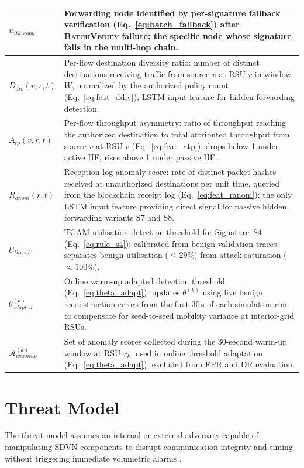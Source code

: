\documentclass[12pt, a4paper]{report}
\begin{document}
\begin{longtable}{|m{5.0cm}|m{9.0cm}|}
\hline
$v_{atk,copy}$ & Forwarding node identified by per-signature fallback verification (Eq.~\ref{eq:batch_fallback}) after \textsc{BatchVerify} failure; the specific node whose signature fails in the multi-hop chain. \\
\hline
$D_{div}(v,r,t)$ & Per-flow destination diversity ratio: number of distinct destinations receiving traffic from source $v$ at \ac{RSU} $r$ in window $W$, normalized by the authorized policy count (Eq.~\ref{eq:feat_ddiv}); \ac{LSTM} input feature for hidden forwarding detection. \\
\hline
$A_{tp}(v,r,t)$ & Per-flow throughput asymmetry: ratio of throughput reaching the authorized destination to total attributed throughput from source $v$ at \ac{RSU} $r$ (Eq.~\ref{eq:feat_atp}); drops below 1 under active \ac{HF}, rises above 1 under passive \ac{HF}. \\
\hline
$R_{anom}(r,t)$ &
Reception log anomaly score: rate of distinct packet
hashes received at unauthorized destinations per
unit time, queried from the blockchain receipt log
(Eq.~\ref{eq:feat_ranom}); the only \ac{LSTM} input
feature providing direct signal for passive hidden
forwarding variants S7 and S8. \\


\hline
$U_{thresh}$ & TCAM utilisation detection threshold for Signature~S4 (Eq.~\ref{eq:rule_s4}); calibrated from benign validation traces; separates benign utilisation ($\leq 29\%$) from attack saturation ($\approx 100\%$). \\
\hline
$\theta^{(k)}_{adapted}$ &
Online warm-up adapted detection threshold
(Eq.~\ref{eq:theta_adapt}); updates
$\theta^{(k)}$ using live benign reconstruction
errors from the first 30\,s of each simulation
run to compensate for seed-to-seed mobility
variance at interior-grid \ac{RSU}s. \\
\hline
$\mathcal{A}_{warmup}^{(k)}$ &
Set of anomaly scores collected during the
30-second warm-up window at \ac{RSU} $r_k$;
used in online threshold adaptation
(Eq.~\ref{eq:theta_adapt}); excluded from
\ac{FPR} and \ac{DR} evaluation. \\
\hline
\end{longtable}
\endgroup
\section{Threat Model}
The threat model assumes an internal or external adversary capable of manipulating SDVN components to disrupt communication integrity and timing without triggering immediate volumetric alarms \cite{PASCOAL2020107223}\cite{DBLP:journals/air/QammarKND23}.
\end{document}
